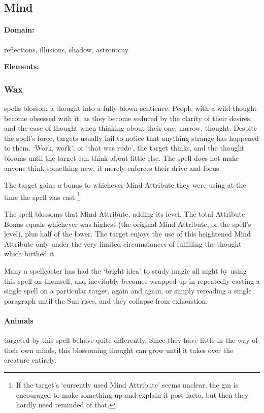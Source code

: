 \begin{multicols}{2}
\subsection{Mind}
\paragraph{Domain:}
reflections, illusions, shadow, astronomy

\textbf{Elements:}

\subsubsection{Wax}
  spells blossom a thought into a fully-blown sentience.
  People with a wild thought become obsessed with it, as they become seduced by the clarity of their desires, and the ease of thought when thinking about their one, narrow, thought.
  Despite the spell's force, targets usually fail to notice that anything strange has happened to them.
  `Work, work', or `that was rude', the target thinks, and the thought blooms until the target can think about little else.
  The spell does not make anyone think something new, it merely enforces their drive and focus.

  The target gains a bonus to whichever Mind Attribute they were using at the time the spell was cast%
  \footnote{If the target's `currently used Mind Attribute' seems unclear, the \gls{gm} is encouraged to make something up and explain it post-facto, but then they hardly need reminded of that.}

  The spell blossoms that Mind Attribute, adding its level.
  The total Attribute Bonus equals whichever was highest (the original Mind Attribute, or the spell's level), plus half of the lower.%
  The target enjoys the use of this heightened Mind Attribute only under the very limited circumstances of fulfilling the thought which birthed it.

  Many a spellcaster has had the `bright idea' to study magic all night by using this spell on themself, and inevitably becomes wrapped up in repeatedly casting a single spell on a particular target, again and again, or simply rereading a single paragraph until the Sun rises, and they collapse from exhaustion.

\paragraph{Animals}
  targeted by this spell behave quite differently.
  Since they have little in the way of their own minds, this blossoming thought can grow until it takes over the creature entirely.


\end{multicols}
